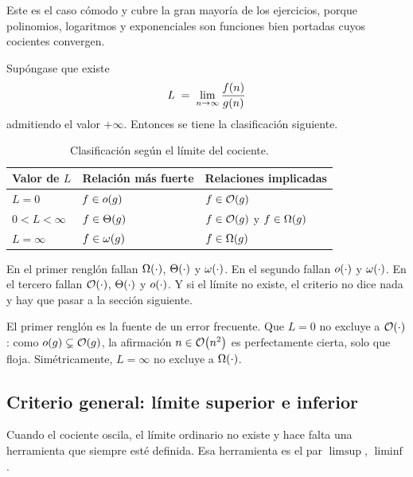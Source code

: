 \documentclass[11pt,letterpaper]{article}
\begin{document}
Este es el caso cómodo y cubre la gran mayoría de los ejercicios,
porque polinomios, logaritmos y exponenciales son funciones bien
portadas cuyos cocientes convergen.

Supóngase que existe
\[
    L \;=\; \lim_{n \to \infty} \frac{f(n)}{g(n)}
\]
admitiendo el valor $+\infty$. Entonces se tiene la clasificación
siguiente.

\begin{table}[htbp]
  \centering
  \begin{tabular}{@{}lll@{}}
    \toprule
    \textbf{Valor de $L$} & \textbf{Relación más fuerte}
      & \textbf{Relaciones implicadas} \\
    \midrule
    $L = 0$          & $f \in o\!\left(g\right)$ & $f \in \mathcal{O}\!\left(g\right)$ \\
    $0 < L < \infty$ & $f \in \Theta\!\left(g\right)$
      & $f \in \mathcal{O}\!\left(g\right)$ y $f \in \Omega\!\left(g\right)$ \\
    $L = \infty$     & $f \in \omega\!\left(g\right)$ & $f \in \Omega\!\left(g\right)$ \\
    \bottomrule
  \end{tabular}
  \caption{Clasificación según el límite del cociente.}
  \label{tab:criterio-limite}
\end{table}

En el primer renglón fallan $\Omega\!\left(\cdot\right)$, $\Theta\!\left(\cdot\right)$ y
$\omega\!\left(\cdot\right)$. En el segundo fallan $o\!\left(\cdot\right)$ y $\omega\!\left(\cdot\right)$. En
el tercero fallan $\mathcal{O}\!\left(\cdot\right)$, $\Theta\!\left(\cdot\right)$ y $o\!\left(\cdot\right)$. Y si
el límite no existe, el criterio no dice nada y hay que pasar a la
sección siguiente.

\begin{observacion}
    El primer renglón es la fuente de un error frecuente. Que $L = 0$
    no excluye a $\mathcal{O}\!\left(\cdot\right)$: como $o\!\left(g\right) \subsetneq \mathcal{O}\!\left(g\right)$, la
    afirmación $n \in \mathcal{O}\!\left(n^2\right)$ es perfectamente cierta, solo que
    floja. Simétricamente, $L = \infty$ no excluye a $\Omega\!\left(\cdot\right)$.
\end{observacion}


\subsection*{Criterio general: límite superior e inferior}

Cuando el cociente oscila, el límite ordinario no existe y hace falta
una herramienta que siempre esté definida. Esa herramienta es el par
$\limsup$, $\liminf$.
\end{document}
